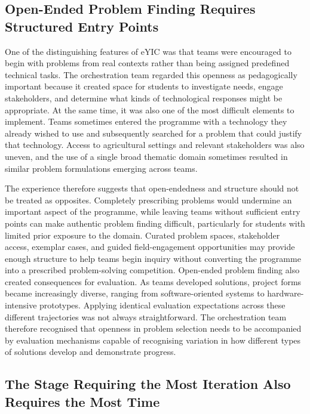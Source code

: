 \documentclass[runningheads]{llncs}
\begin{document}
\subsection{Open-Ended Problem Finding Requires Structured Entry Points}

One of the distinguishing features of eYIC was that teams were encouraged to begin with problems from real contexts rather than being assigned predefined technical tasks. The orchestration team regarded this openness as pedagogically important because it created space for students to investigate needs, engage stakeholders, and determine what kinds of technological responses might be appropriate. At the same time, it was also one of the most difficult elements to implement. Teams sometimes entered the programme with a technology they already wished to use and subsequently searched for a problem that could justify that technology. Access to agricultural settings and relevant stakeholders was also uneven, and the use of a single broad thematic domain sometimes resulted in similar problem formulations emerging across teams.

The experience therefore suggests that open-endedness and structure should not be treated as opposites. Completely prescribing problems would undermine an important aspect of the programme, while leaving teams without sufficient entry points can make authentic problem finding difficult, particularly for students with limited prior exposure to the domain. Curated problem spaces, stakeholder access, exemplar cases, and guided field-engagement opportunities may provide enough structure to help teams begin inquiry without converting the programme into a prescribed problem-solving competition. Open-ended problem finding also created consequences for evaluation. As teams developed solutions, project forms became increasingly diverse, ranging from software-oriented systems to hardware-intensive prototypes. Applying identical evaluation expectations across these different trajectories was not always straightforward. The orchestration team therefore recognised that openness in problem selection needs to be accompanied by evaluation mechanisms capable of recognising variation in how different types of solutions develop and demonstrate progress.

\subsection{The Stage Requiring the Most Iteration Also Requires the Most Time}
\end{document}
